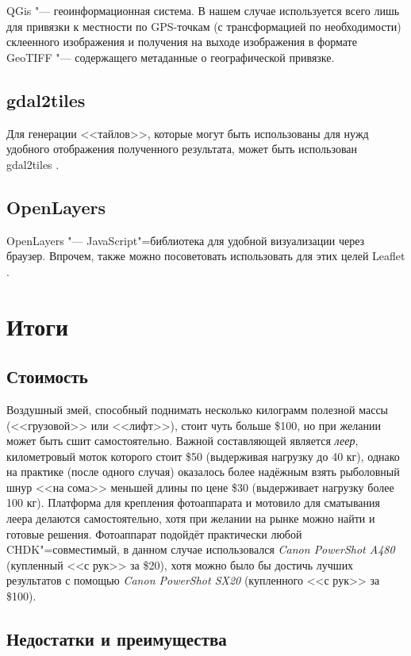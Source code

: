 \documentclass[10pt, a5paper]{article}
\begin{document}
QGis \cite{samsbib3} "--- геоинформационная система. В нашем случае используется всего лишь для привязки к местности по GPS-точкам (с трансформацией по необходимости) склеенного изображения и получения на выходе изображения в формате GeoTIFF "--- содержащего метаданные о географической привязке.

\subsection*{gdal2tiles}

Для генерации <<тайлов>>, которые могут быть использованы для нужд удобного отображения полученного результата, может быть использован gdal2tiles \cite{samsbib4}.

\subsection*{OpenLayers}

OpenLayers \cite{samsbib5} "--- JavaScript"=библиотека для удобной визуализации через браузер. Впрочем, также можно посоветовать использовать для этих целей Leaflet \cite{samsbib6}.

\section*{Итоги}

\subsection*{Стоимость}

Воздушный змей, способный поднимать несколько килограмм полезной массы (<<грузовой>> или <<лифт>>), стоит чуть больше \$100, но при желании может быть сшит самостоятельно. Важной составляющей является \emph{леер}, километровый моток которого стоит \$50 (выдерживая нагрузку до 40 кг), однако на практике (после одного случая) оказалось более надёжным взять рыболовный шнур <<на сома>> меньшей длины по цене \$30 (выдерживает нагрузку более 100 кг). Платформа для крепления фотоаппарата и мотовило для сматывания леера делаются самостоятельно, хотя при желании на рынке можно найти и готовые решения. Фотоаппарат подойдёт практически любой CHDK"=совместимый, в данном случае использовался \emph{Canon PowerShot A480} (купленный <<с рук>> за \$20), хотя можно было бы достичь лучших результатов с помощью \emph{Canon PowerShot SX20} (купленного <<с рук>> за \$100).

\subsection*{Недостатки и преимущества}
\end{document}
